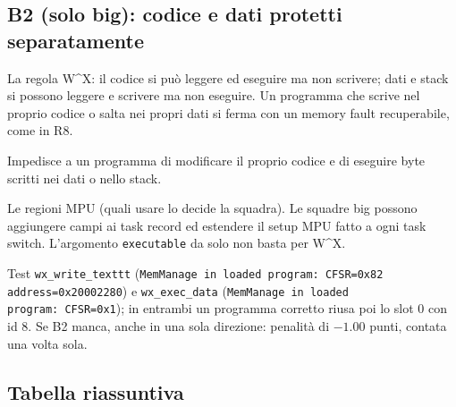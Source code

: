 \subsection{B2 (solo big): codice e dati protetti separatamente}
\begin{description}\sloppy
\item[Che cosa chiede] La regola W\textasciicircum{}X: il codice si può leggere ed eseguire ma non scrivere; dati e stack si possono leggere e scrivere ma non eseguire. Un programma che scrive nel proprio codice o salta nei propri dati si ferma con un memory fault recuperabile, come in R8.
\item[Perché serve] Impedisce a un programma di modificare il proprio codice e di eseguire byte scritti nei dati o nello stack.
\item[Dove si interviene] Le regioni MPU (quali usare lo decide la squadra). Le squadre big possono aggiungere campi ai task record ed estendere il setup MPU fatto a ogni task switch. L'argomento \texttt{executable} da solo non basta per W\textasciicircum{}X.
\item[Come si verifica] Test \texttt{wx\_write\_texttt} (\texttt{MemManage in loaded program:\ CFSR=0x82 address=0x20002280}) e \texttt{wx\_exec\_data} (\texttt{MemManage in loaded program:\ CFSR=0x1}); in entrambi un programma corretto riusa poi lo slot 0 con id 8. Se B2 manca, anche in una sola direzione: penalità di $-1.00$ punti, contata una volta sola.
\end{description}

\subsection{Tabella riassuntiva}

